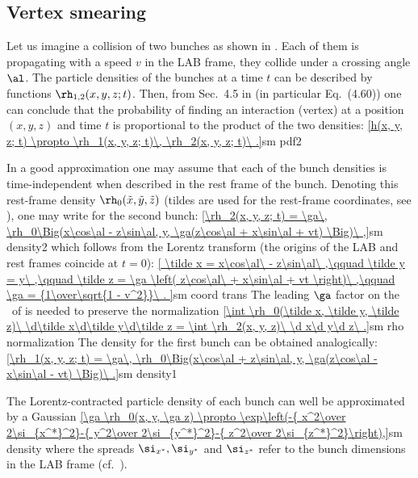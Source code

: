 \subsection{Vertex smearing}


Let us imagine a collision of two bunches as shown in . Each of them is propagating with a speed $v$ in the LAB frame, they collide under a crossing angle $\al$. The particle densities of the bunches at a time $t$ can be described by functions $\rh_{1, 2}(x, y, z; t)$. Then, from Sec.~4.5 in  (in particular Eq.~(4.60)) one can conclude that the probability of finding an interaction (vertex) at a position $(x, y, z)$ and time $t$ is proportional to the product of the two densities:
\eqref{h(x, y, z; t) \propto \rh_1(x, y, z; t)\, \rh_2(x, y, z; t)\ .}{sm pdf2}

In a good approximation one may assume that each of the bunch densities is time-independent when described in the rest frame of the bunch. Denoting this rest-frame density $\rh_0(\tilde x, \tilde y, \tilde z)$ (tildes are used for the rest-frame coordinates, see ), one may write for the second bunch:
\eqref{\rh_2(x, y, z; t) = \ga\, \rh_0\Big(x\cos\al - z\sin\al, y, \ga(z\cos\al + x\sin\al + vt) \Big)\ ,}{sm density2}
which follows from the Lorentz transform (the origins of the LAB and rest frames coincide at $t=0$):
\eqref{
	\tilde x = x\cos\al\ - z\sin\al\ ,\qquad
	\tilde y = y\ ,\qquad
	\tilde z = \ga \left( z\cos\al\ + x\sin\al + vt \right)\ ,\qquad
	\ga = {1\over\sqrt{1 - v^2}}\ .
}{sm coord trans}
The leading $\ga$ factor on the \rhs~of  is needed to preserve the normalization
\eqref{\int \rh_0(\tilde x, \tilde y, \tilde z)\ \d\tilde x\d\tilde y\d\tilde z = \int \rh_2(x, y, z)\ \d x\d y\d z\ .}{sm rho normalization}
The density for the first bunch can be obtained analogically:
\eqref{\rh_1(x, y, z; t) = \ga\, \rh_0\Big(x\cos\al + z\sin\al, y, \ga(z\cos\al - x\sin\al - vt) \Big)\ .}{sm density1}

The Lorentz-contracted particle density of each bunch can well be approximated by a Gaussian 
\eqref{\ga \rh_0(x, y, \ga z) \propto \exp\left(-{ x^2\over 2\si_{x^*}^2}-{ y^2\over 2\si_{y^*}^2}-{ z^2\over 2\si_{z^*}^2}\right),}{sm density}
where the spreads $\si_{x^*}, \si_{y^*}$ and $\si_{z^*}$ refer to the bunch dimensions in the LAB frame (cf.~).

